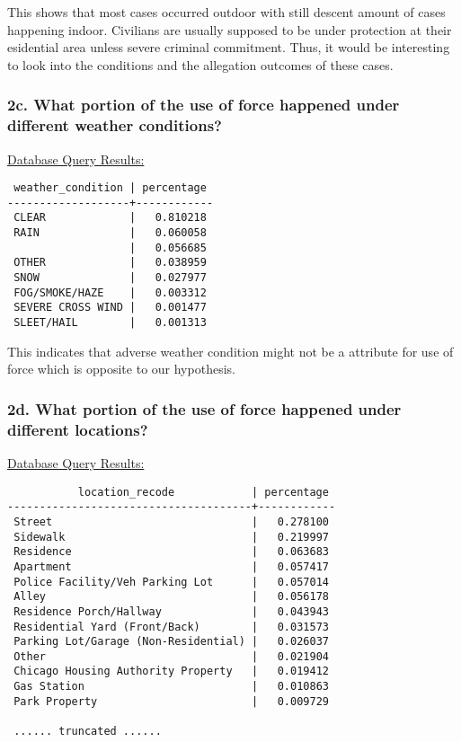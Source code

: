 \documentclass[10pt]{article}
\begin{document}
This shows that most cases occurred outdoor with still descent amount of cases happening indoor. Civilians are usually supposed to be under protection at their esidential area unless severe criminal commitment. Thus, it would be interesting to look into the conditions and the allegation outcomes of these cases.

\subsubsection*{2c. What portion of the use of force happened under different weather conditions?}

\underline{Database Query Results:}

\begin{verbatim}
 weather_condition | percentage
-------------------+------------
 CLEAR             |   0.810218
 RAIN              |   0.060058
                   |   0.056685
 OTHER             |   0.038959
 SNOW              |   0.027977
 FOG/SMOKE/HAZE    |   0.003312
 SEVERE CROSS WIND |   0.001477
 SLEET/HAIL        |   0.001313
\end{verbatim}

This indicates that adverse weather condition might not be a attribute for use of force which is opposite to our hypothesis.

\subsubsection*{2d. What portion of the use of force happened under different locations?}

\underline{Database Query Results:}

\begin{verbatim}
           location_recode            | percentage
--------------------------------------+------------
 Street                               |   0.278100
 Sidewalk                             |   0.219997
 Residence                            |   0.063683
 Apartment                            |   0.057417
 Police Facility/Veh Parking Lot      |   0.057014
 Alley                                |   0.056178
 Residence Porch/Hallway              |   0.043943
 Residential Yard (Front/Back)        |   0.031573
 Parking Lot/Garage (Non-Residential) |   0.026037
 Other                                |   0.021904
 Chicago Housing Authority Property   |   0.019412
 Gas Station                          |   0.010863
 Park Property                        |   0.009729

 ...... truncated ......
\end{verbatim}
\end{document}
